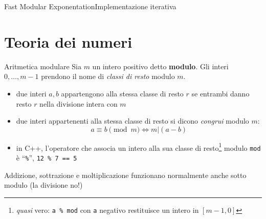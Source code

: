 \documentclass[compress]{beamer}
\begin{document}
\begin{frame}{Fast Modular Exponentation}{Implementazione iterativa}
\end{frame}

\section{Teoria dei numeri}
\begin{frame}{Aritmetica modulare}
    Sia $m$ un intero positivo detto \textbf{modulo}. Gli interi $0,\dots,m-1$ prendono il nome di \textit{classi di resto} modulo $m$.
    \begin{itemize}
        \item due interi $a,b$ appartengono alla stessa classe di resto $r$ se entrambi danno resto $r$ nella divisione intera con $m$
        \item due interi appartenenti alla stessa classe di resto si dicono \textit{congrui} modulo $m$:
            $$a \equiv b \pmod m \iff m | (a-b)$$
        \pause
        \item in \textsc{C++}, l'operatore che associa un intero alla sua classe di resto\footnote{\textit{quasi} vero: \texttt{a \% mod} con \texttt{a} negativo restituisce un intero in $[m-1, 0]$} modulo \texttt{mod} \`e ``\texttt{\%}'', \texttt{12 \% 7 == 5}
    \end{itemize}
    \begin{block}{}
        Addizione, sottrazione e moltiplicazione funzionano normalmente anche sotto modulo (la divisione no!)
    \end{block}
\end{frame}
\end{document}
